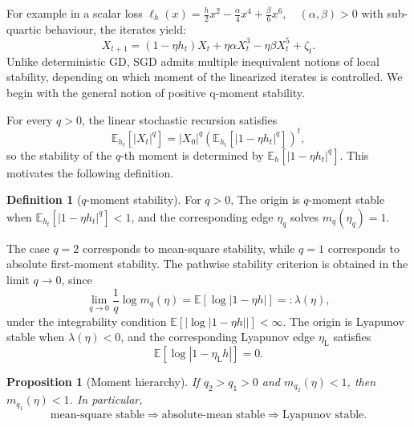 \documentclass{article} %
\theoremstyle{plain}
\newtheorem{proposition}{Proposition}
\theoremstyle{definition}
\newtheorem{definition}{Definition}
\begin{document}
For example in a scalar loss $ \ell_h(x)=\frac{h}{2}x^2-\frac{\alpha}{4}x^4+\frac{\beta}{6}x^6,
 \quad (\alpha,\beta)>0$ with sub-quartic behaviour, the iterates yield:
\begin{equation}
 X_{t+1}=(1-\eta h_t)X_t+\eta\alpha X_t^3-\eta\beta X_t^5+\zeta_t.
 \label{eq:polynomialsgd}
\end{equation}
Unlike deterministic GD, SGD admits multiple inequivalent notions of local stability, depending on which moment of the linearized iterates is controlled. We begin with the general notion of positive q-moment stability.

For every $q>0$, the linear stochastic recursion satisfies
\begin{equation}
    \mathbb{E}_{h_t}\left[|X_t|^q\right]
    =
    |X_0|^q
    \left(
        \mathbb{E}_{h_t}\left[|1-\eta h_t|^q\right]
    \right)^t,
\end{equation}
so the stability of the $q$-th moment is determined by
$\mathbb{E}_{h}[|1-\eta h_t|^q]$. This motivates the following definition.
\begin{definition}[$q$-moment stability]
For $q>0$, 
The origin is $q$-moment stable when $\mathbb{E}_{h_{t}}[|1-\eta h_t|^q]<1$, and the corresponding edge $\eta_q$ solves $m_q(\eta_q)=1$.
\end{definition}

The case $q=2$ corresponds to mean-square stability, while $q=1$ corresponds to absolute first-moment stability. The pathwise stability criterion is obtained in the limit $q\to 0$, since
\begin{equation}
    \lim_{q\to 0}\frac{1}{q}\log m_q(\eta)
    =
    \mathbb{E}\!\left[\log |1-\eta h|\right]
    =: \lambda(\eta),
\end{equation}
under the integrability condition
$\mathbb{E}[|\log |1-\eta h||]<\infty$.
The origin is Lyapunov stable when $\lambda(\eta)<0$, and the corresponding Lyapunov edge $\eta_{\mathrm{L}}$ satisfies
\begin{equation}
    \mathbb{E}\!\left[\log |1-\eta_{\mathrm{L}}h|\right]=0.
\end{equation}

\begin{proposition}[Moment hierarchy]
If $q_2>q_1>0$ and $m_{q_2}(\eta)<1$, then $m_{q_1}(\eta)<1$.  In particular,
\begin{equation}
    \text{mean-square stable}
    \Longrightarrow
    \text{absolute-mean stable}
    \Longrightarrow
    \text{Lyapunov stable}.
    \label{eq:hierarchy}
\end{equation}
\end{proposition}
\end{document}
